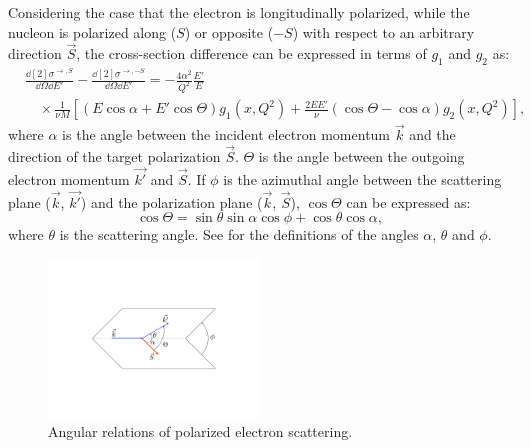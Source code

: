 Considering the case that the electron is longitudinally polarized, while the nucleon is polarized along ($S$) or opposite ($-S$) with respect to an arbitrary direction $\vec{S}$, the cross-section difference can be expressed in terms of $g_1$ and $g_2$ as:
\begin{equation} \label{C2S2E23}
\begin{split}
& \frac{\dd[2]{\sigma}^{\rightarrow,S}}{\dd{\Omega}\dd{E'}}-\frac{\dd[2]{\sigma}^{\rightarrow,-S}}{\dd{\Omega}\dd{E'}} = -\frac{4\alpha^2}{Q^2}\frac{E'}{E} \\
& \quad \times\frac{1}{\nu M}\left[(E\cos\alpha+E'\cos\Theta)g_1(x,Q^2)+\frac{2EE'}{\nu}(\cos\Theta-\cos\alpha)g_2(x,Q^2)\right],
\end{split}
\end{equation}
where $\alpha$ is the angle between the incident electron momentum $\vec{k}$ and the direction of the target polarization $\vec{S}$. $\Theta$ is the angle between the outgoing electron momentum $\vec{k'}$ and $\vec{S}$. If $\phi$ is the azimuthal angle between the scattering plane ($\vec{k}$, $\vec{k'}$) and the polarization plane ($\vec{k}$, $\vec{S}$), $\cos\Theta$ can be expressed as:
\begin{equation} \label{C2S2E24}
\cos\Theta = \sin\theta\sin\alpha\cos\phi+\cos\theta\cos\alpha,
\end{equation}
where $\theta$ is the scattering angle. See  for the definitions of the angles $\alpha$, $\theta$ and $\phi$.

\begin{figure}[tb!]
  \centering
  \includegraphics[width=0.5\textwidth]{figs/angles-of-polarized-scattering.pdf}
  \caption[Angular relations of polarized electron scattering.]{Angular relations of polarized electron scattering. \label{C2S2F1}}
\end{figure}

